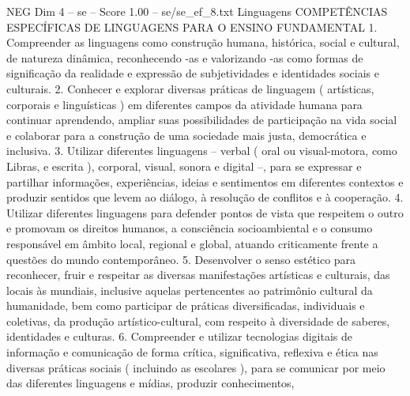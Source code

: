 \begin{textsample}{NEG Dim 4 – se – Score 1.00 – se/se\_ef\_8.txt}  \label{ex:f4_neg_147}
Linguagens COMPETÊNCIAS ESPECÍFICAS DE LINGUAGENS PARA O ENSINO FUNDAMENTAL 1.
Compreender as linguagens como construção humana, histórica, social e cultural, de natureza dinâmica, reconhecendo -as e valorizando -as como formas de significação da realidade e expressão de subjetividades e identidades sociais e culturais. 2.
Conhecer e explorar diversas práticas de linguagem ( artísticas, corporais e linguísticas ) em diferentes campos da atividade humana para continuar aprendendo, ampliar suas possibilidades de participação na vida social e colaborar para a construção de uma sociedade mais justa, democrática e inclusiva. 3.
Utilizar diferentes linguagens – verbal ( oral ou visual-motora, como Libras, e escrita ), corporal, visual, sonora e digital –, para se expressar e partilhar informações, experiências, ideias e sentimentos em diferentes contextos e produzir sentidos que levem ao diálogo, à resolução de conflitos e à cooperação. 4.
Utilizar diferentes linguagens para defender pontos de vista que respeitem o outro e promovam os direitos humanos, a consciência socioambiental e o consumo responsável em âmbito local, regional e global, atuando criticamente frente a questões do mundo contemporâneo. 5.
Desenvolver o senso estético para reconhecer, fruir e respeitar as diversas manifestações artísticas e culturais, das locais às mundiais, inclusive aquelas pertencentes ao patrimônio cultural da humanidade, bem como participar de práticas diversificadas, individuais e coletivas, da produção artístico-cultural, com respeito à diversidade de saberes, identidades e culturas. 6.
Compreender e utilizar tecnologias digitais de informação e comunicação de forma crítica, significativa, reflexiva e ética nas diversas práticas sociais ( incluindo as escolares ), para se comunicar por meio das diferentes linguagens e mídias, produzir conhecimentos,

\end{textsample}
